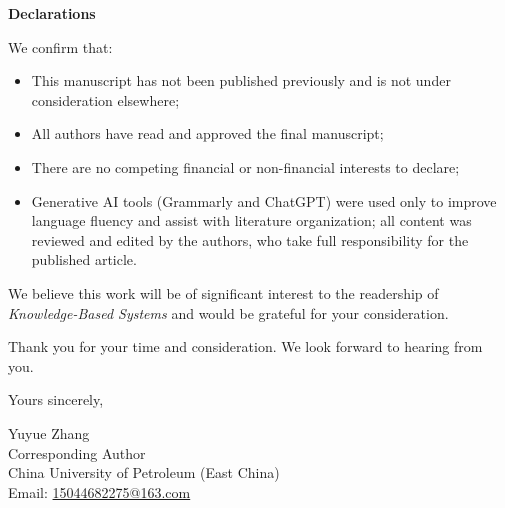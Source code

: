 \documentclass[11pt]{article}
\begin{document}
\vspace{1em}

\textbf{Declarations}

We confirm that:
\begin{itemize}[leftmargin=*,nosep]
\item This manuscript has not been published previously and is not under consideration elsewhere;
\item All authors have read and approved the final manuscript;
\item There are no competing financial or non-financial interests to declare;
\item Generative AI tools (Grammarly and ChatGPT) were used only to improve language fluency and assist with literature organization; all content was reviewed and edited by the authors, who take full responsibility for the published article.
\end{itemize}

\vspace{1em}

We believe this work will be of significant interest to the readership of \textit{Knowledge-Based Systems} and would be grateful for your consideration.

\vspace{1em}

Thank you for your time and consideration. We look forward to hearing from you.

\vspace{2em}

Yours sincerely,

\vspace{2em}

Yuyue Zhang\\
Corresponding Author\\
China University of Petroleum (East China)\\
Email: \href{mailto:15044682275@163.com}{15044682275@163.com}
\end{document}
